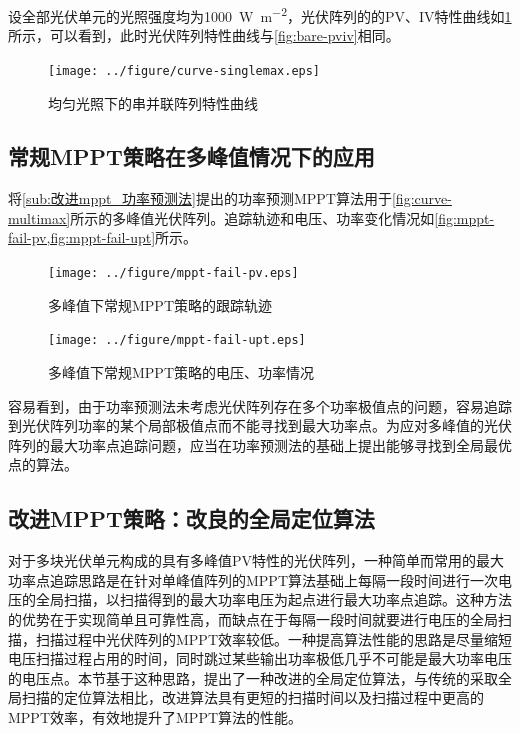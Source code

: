 \documentclass[a4paper,12pt]{article}
\begin{document}
    设全部光伏单元的光照强度均为\SI{1000}{\watt\per\meter\squared}，光伏阵列的的PV、IV特性曲线如\cref{fig:curve-singlemax}所示，可以看到，此时光伏阵列特性曲线与\cref{fig:bare-pviv}相同。
    \begin{figure}[htbp]
        \centering
        \texttt{[image: ../figure/curve-singlemax.eps]}
        \caption{均匀光照下的串并联阵列特性曲线}
        \label{fig:curve-singlemax}
    \end{figure}
    \subsection{常规MPPT策略在多峰值情况下的应用} %
    \label{sub:常规mppt策略在多峰值情况下的应用}
    将\cref{sub:改进mppt_功率预测法}提出的功率预测MPPT算法用于\cref{fig:curve-multimax}所示的多峰值光伏阵列。追踪轨迹和电压、功率变化情况如\cref{fig:mppt-fail-pv,fig:mppt-fail-upt}所示。
    \begin{figure}[htbp]
        \centering
        \texttt{[image: ../figure/mppt-fail-pv.eps]}
        \caption{多峰值下常规MPPT策略的跟踪轨迹}
        \label{fig:mppt-fail-pv}
    \end{figure}
    \begin{figure}[htbp]
        \centering
        \texttt{[image: ../figure/mppt-fail-upt.eps]}
        \caption{多峰值下常规MPPT策略的电压、功率情况}
        \label{fig:mppt-fail-upt}
    \end{figure}
    容易看到，由于功率预测法未考虑光伏阵列存在多个功率极值点的问题，容易追踪到光伏阵列功率的某个局部极值点而不能寻找到最大功率点。为应对多峰值的光伏阵列的最大功率点追踪问题，应当在功率预测法的基础上提出能够寻找到全局最优点的算法。
    \subsection{改进MPPT策略：改良的全局定位算法} %
    \label{sub:改进mppt策略_改良的全局定位算法}
    对于多块光伏单元构成的具有多峰值PV特性的光伏阵列，一种简单而常用的最大功率点追踪思路是在针对单峰值阵列的MPPT算法基础上每隔一段时间进行一次电压的全局扫描，以扫描得到的最大功率电压为起点进行最大功率点追踪\cite{葛俊杰赵争鸣-521}。这种方法的优势在于实现简单且可靠性高，而缺点在于每隔一段时间就要进行电压的全局扫描，扫描过程中光伏阵列的MPPT效率较低。一种提高算法性能的思路是尽量缩短电压扫描过程占用的时间，同时跳过某些输出功率极低几乎不可能是最大功率电压的电压点。本节基于这种思路，提出了一种改进的全局定位算法，与传统的采取全局扫描的定位算法相比，改进算法具有更短的扫描时间以及扫描过程中更高的MPPT效率，有效地提升了MPPT算法的性能。
\end{document}
